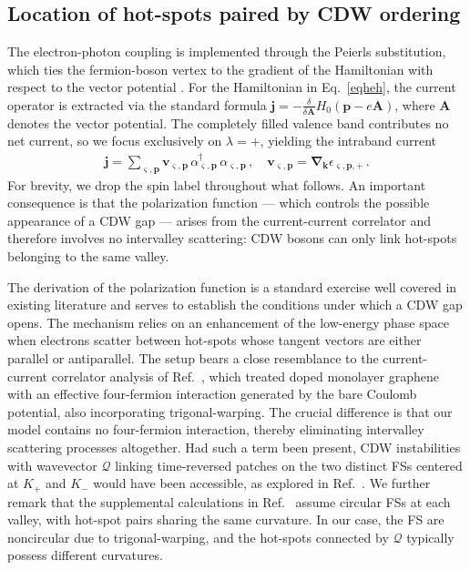 \subsection{Location of hot-spots paired by CDW ordering}

The electron-photon coupling is implemented through the Peierls 
substitution, which ties the fermion-boson vertex to the gradient of 
the Hamiltonian with respect to the vector potential \cite{peng}. For 
the Hamiltonian in Eq.~\eqref{eqheh}, the current operator is extracted 
via the standard formula $\mathbf{j} = -\frac{\delta}{\delta\mathbf{A}}
H_0(\mathbf{p} - e\mathbf{A})$, where $\mathbf{A}$ denotes the vector 
potential. The completely filled valence band contributes no net 
current, so we focus exclusively on $\lambda = +$, yielding the 
intraband current
\begin{align}
\label{eqcur}
\mathbf{j} = \sum_{\varsigma,\mathbf{p}} \mathbf{v}_{\varsigma,\mathbf{p}}\,
\alpha_{\varsigma,\mathbf{p}}^\dagger\,\alpha^{\phantom{\dagger}}_{\varsigma,\mathbf{p}}\,, 
\quad
\mathbf{v}_{\varsigma,\mathbf{p}} = 
\boldsymbol{\nabla}_{\mathbf{k}}\epsilon_{\varsigma,\mathbf{p},+}\,.
\end{align}
For brevity, we drop the spin label throughout what follows. An 
important consequence is that the polarization function --- which 
controls the possible appearance of a CDW gap --- arises from the 
current-current correlator and therefore involves no intervalley 
scattering: CDW bosons can only link hot-spots belonging to the same 
valley.

The derivation of the polarization function is a standard exercise 
well covered in existing literature and serves to establish the 
conditions under which a CDW gap opens. The mechanism relies on an 
enhancement of the low-energy phase space when electrons scatter 
between hot-spots whose tangent vectors are either parallel or 
antiparallel. The setup bears a close resemblance to the 
current-current correlator analysis of Ref.~\cite{maslov-dfl}, which 
treated doped monolayer graphene with an effective four-fermion 
interaction generated by the bare Coulomb potential, also incorporating 
trigonal-warping. The crucial difference is that our model contains no 
four-fermion interaction, thereby eliminating intervalley scattering 
processes altogether. Had such a term been present, CDW instabilities 
with wavevector $\boldsymbol{\mathcal{Q}}$ linking time-reversed 
patches on the two distinct FSs centered at $K_+$ and $K_-$ 
would have been accessible, as explored in Ref.~\cite{levitov}. We 
further remark that the supplemental calculations in Ref.~\cite{peng} 
assume circular FSs at each valley, with hot-spot pairs 
sharing the same curvature. In our case, the FS are 
noncircular due to trigonal-warping, and the hot-spots connected by 
$\boldsymbol{\mathcal{Q}}$ typically possess different curvatures.
 
